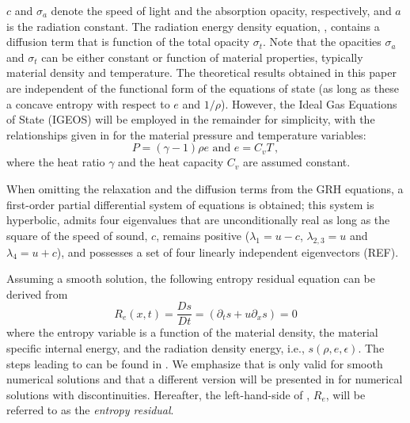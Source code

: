 \documentclass[times,doublespace]{fldauth}%
\begin{document}
$c$ and $\sigma_a$ denote the speed of light and the absorption opacity, respectively, and $a$ is the radiation 
constant. The radiation energy density equation, , contains a diffusion term that is function of the 
total opacity $\sigma_t$. Note that the opacities $\sigma_a$ and $\sigma_t$ can be either constant or function of 
material properties, typically material density and temperature. 
The theoretical results obtained in this paper are independent of the functional form of the equations of state 
(as long as these a concave entropy with respect to $e$ and $1/ \rho$). However, the Ideal Gas Equations of State
(IGEOS) will be employed in the remainder for simplicity, with the relationships given in  for the material pressure and temperature variables:
%
\begin{equation}\label{eq:IGEOS}
P = (\gamma-1) \rho e \text{  and  } e = C_v T \, ,
\end{equation}
%
where the heat ratio $\gamma$ and the heat capacity $C_v$ are assumed constant.

When omitting the relaxation and the diffusion terms from the GRH equations, a first-order partial differential system 
of equations is obtained; this system is hyperbolic, admits four eigenvalues that are unconditionally real as long as the square of the speed of sound, $c$, remains positive ($\lambda_1 = u - c$, $\lambda_{2,3} = u$ and  $\lambda_4 = u + c$), and possesses a set of four linearly independent eigenvectors (REF).  

Assuming a smooth solution, the following entropy residual equation can be derived from 
%
\begin{equation}\label{eq:GRH-entropy}
R_e(x,t) = \frac{D s}{Dt} = \left( \partial_t s + u \partial_x s \right) = 0
\end{equation}
%
where the entropy variable is a function of the material density, the material specific internal energy, 
and the radiation density energy, i.e., $s(\rho, e, \epsilon)$. The steps leading to  
can be found in \cite{our_jcp_radhy_paper}.
We emphasize that  is only valid for smooth numerical solutions and that a different version 
will be presented in  for numerical solutions with discontinuities. 
Hereafter, the left-hand-side of , $R_e$, will be referred to as the \emph{entropy residual}.
\end{document}
